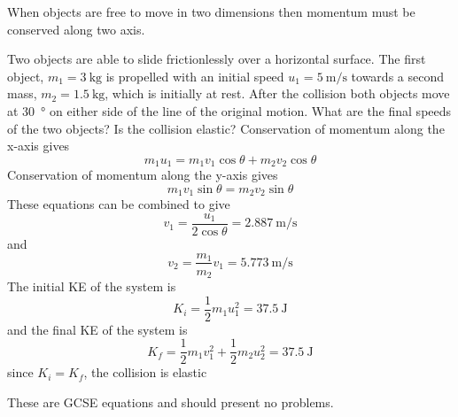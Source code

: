 \documentclass[revision-guide.tex]{subfiles}
\begin{document}

When objects are free to move in two dimensions then momentum must be conserved along two axis.

\begin{example}
	Two objects are able to slide frictionlessly over a horizontal surface. The first object, $m_1=\SI{3}{\kg}$ is propelled with an initial speed $u_1=\SI{5}{\m\per\s}$ towards a second mass, $m_2=\SI{1.5}{\kg}$, which is initially at rest. After the collision both objects move at \SI{30}{\degree} on either side of the line of the original motion. What are the final speeds of the two objects? Is the collision elastic?
	\answer
	Conservation of momentum along the x-axis gives
	$$ m_1u_1 = m_1v_1\cos{\theta} + m_2v_2\cos{\theta}$$
	Conservation of momentum along the y-axis gives
	$$ m_1v_1\sin{\theta} = m_2v_2\sin{\theta} $$
	These equations can be combined to give
	$$ v_1 = \frac{u_1}{2\cos{\theta}} = \SI{2.887}{\m\per\s}$$
	and
	$$ v_2 = \frac{m_1}{m_2}v_1= \SI{5.773}{\m\per\s}$$
	The initial KE of the system is
	$$ K_i = \frac{1}{2}m_1u_1^2 = \SI{37.5}{\joule} $$
	and the final KE of the system is
	$$ K_f = \frac{1}{2}m_1v_1^2 + \frac{1}{2}m_2u_2^2 = \SI{37.5}{\joule}$$
	since $K_i = K_f$, the collision is elastic
\end{example}

These are GCSE equations and should present no problems.
\end{document}
